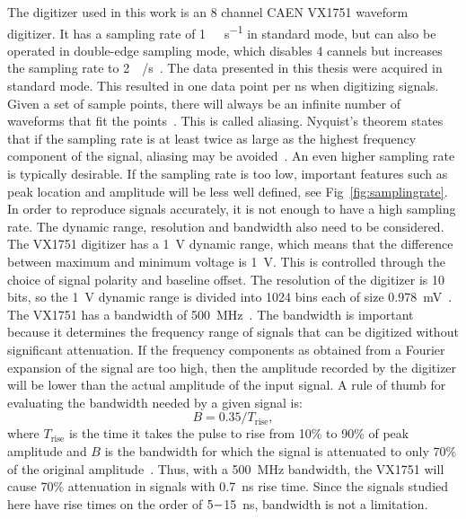 \documentclass[main.tex]{subfiles}
\begin{document}
The digitizer used in this work is an 8 channel CAEN VX1751 waveform digitizer. It has a sampling rate of \si{1\giga\sample\per\second} in standard mode, but can also be operated in double-edge sampling mode, which disables 4 cannels but increases the sampling rate to \SI{2}{\giga\sample/\second}~\cite{CAEN}. The data presented in this thesis were acquired in standard mode. This resulted in one data point per \si{ns} when digitizing signals. Given a set of sample points, there will always be an infinite number of waveforms that fit the points~\cite{Spectrum}. This is called aliasing. Nyquist's theorem states that if the sampling rate is at least twice as large as the highest frequency component of the signal, aliasing may be avoided~\cite{Spectrum}. An even higher sampling rate is typically desirable. If the sampling rate is too low, important features such as peak location and amplitude will be less well defined, see Fig~\ref{fig:samplingrate}.
In order to reproduce signals accurately, it is not enough to have a high sampling rate. The dynamic range, resolution and bandwidth also need to be considered. 
The VX1751 digitizer has a \SI{1}{V} dynamic range, which means that the difference between maximum and minimum voltage is \SI{1}{V}. This is controlled through the choice of signal polarity and baseline offset. The resolution of the digitizer is 10 bits, so the \SI{1}{V} dynamic range is divided into 1024 bins each of size \SI{0.978}{\milli\volt}~\cite{CAEN}.
The VX1751 has a bandwidth of \SI{500}{\mega\hertz}~\cite{CAEN}. The bandwidth is important because it determines the frequency range of signals that can be digitized without significant attenuation. If the frequency components as obtained from a Fourier expansion of the signal are too high, then the amplitude recorded by the digitizer will be lower than the actual amplitude of the input signal. A rule of thumb for evaluating the bandwidth needed by a given signal is:
\begin{equation}
\label{eq:bandwidth}
B=0.35/T_{\textrm{rise}},
\end{equation}
where $T_\textrm{rise}$ is the time it takes the pulse to rise from 10\% to 90\% of peak amplitude and $B$ is the bandwidth for which the signal is attenuated to only 70\% of the original amplitude~\cite{Leo}. Thus, with a \SI{500}{MHz} bandwidth, the VX1751 will cause 70\% attenuation in signals with \SI{0.7}{ns} rise time. Since the signals studied here have rise times on the order of $5\--$\SI{15}{ns}, bandwidth is not a limitation.
\end{document}
